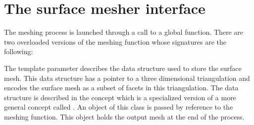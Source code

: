 \section{The surface mesher interface}
\label{SurfaceMesher_section_interface}

The meshing process is launched through a call to a global function.
There are two overloaded versions of the meshing function
whose signatures are the following:






The template parameter  describes 
the data structure
used to store  the surface mesh. This data structure
has a pointer to a three dimensional triangulation and encodes
the surface mesh as a subset of facets in this triangulation.
The data structure is described in the concept
 which is a specialized version
of a more general concept called  .
An object of this class is passed by reference to the meshing
function. This object holds the output mesh at the end of the
process.


